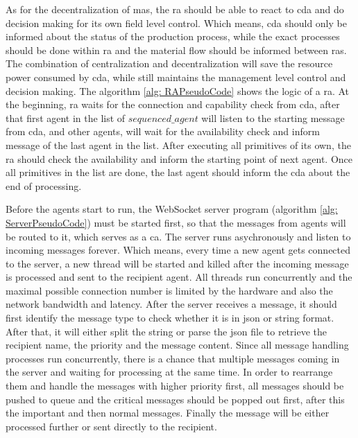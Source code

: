 As for the decentralization of \gls{mas}, the \gls{ra} should be able to react to \gls{cda} and do decision making for its own field level control.  
Which means, \gls{cda} should only be informed about the status of the production process, while the exact processes should be done within \gls{ra} and the material flow should be informed between \gls{ras}. The combination of centralization and decentralization will save the resource power consumed by \gls{cda}, 
while still maintains the management level control and decision making.  
The algorithm \ref{alg: RAPseudoCode} shows the logic of a \gls{ra}. At the beginning, \gls{ra} waits for the connection and capability check from \gls{cda}, after that first agent in the list of $sequenced\_agent$ will listen to the starting message from \gls{cda}, 
and other agents, will wait for the availability check and inform message of the last agent in the list. 
After executing all primitives of its own, the \gls{ra} should check the availability and inform the starting point of next agent.  
Once all primitives in the list are done, the last agent should inform the \gls{cda} about the end of processing.


Before the agents start to run, the WebSocket server program (algorithm \ref{alg: ServerPseudoCode}) must be started first, so that the messages from agents will be routed to it, which serves as a \gls{ca}.  
The server runs asychronously and listen to incoming messages forever. 
Which means, every time a new agent gets connected to the server, a new thread will be started and killed after the incoming message is processed and sent to the recipient agent. 
All threads run concurrently and the maximal possible connection number is limited by the hardware and also the network bandwidth and latency. 
After the server receives a message, it should first identify the message type to check whether it is in json or string format. 
After that, it will either split the string or parse the json file to retrieve the recipient name, the priority and the message content. 
Since all message handling processes run concurrently, there is a chance that multiple messages coming in the server and waiting for processing at the same time. 
In order to rearrange them and handle the messages with higher priority first, all messages should be pushed to queue and the critical messages should be popped out first, after this the important and then normal messages. 
Finally the message will be either processed further or sent directly to the recipient. 

